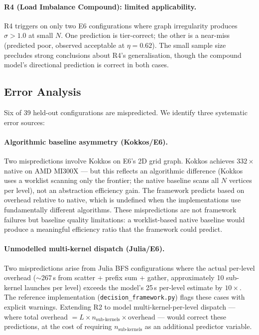 \paragraph{R4 (Load Imbalance Compound): limited applicability.}
R4 triggers on only two E6 configurations where graph irregularity
produces $\sigma > 1.0$ at small $N$. One prediction is tier-correct;
the other is a near-miss (predicted poor, observed acceptable at
$\eta = 0.62$). The small sample size precludes strong conclusions about
R4's generalisation, though the compound model's directional prediction
is correct in both cases.

\subsection{Error Analysis}
\label{subsec:error_analysis}

Six of 39 held-out configurations are mispredicted. We identify three
systematic error sources:

\paragraph{Algorithmic baseline asymmetry (Kokkos/E6).}
Two mispredictions involve Kokkos on E6's 2D grid graph. Kokkos achieves
$332\times$ native on AMD MI300X --- but this reflects an algorithmic
difference (Kokkos uses a worklist scanning only the frontier; the native
baseline scans all $N$ vertices per level), not an abstraction efficiency
gain. The framework predicts based on overhead relative to native, which
is undefined when the implementations use fundamentally different
algorithms. These mispredictions are not framework failures but baseline
quality limitations: a worklist-based native baseline would produce a
meaningful efficiency ratio that the framework could predict.

\paragraph{Unmodelled multi-kernel dispatch (Julia/E6).}
Two mispredictions arise from Julia BFS configurations where the actual
per-level overhead ($\sim$267\,\textmu{}s from scatter + prefix sum +
gather, approximately 10 sub-kernel launches per level) exceeds the
model's 25\,\textmu{}s per-level estimate by $10\times$. The
reference implementation (\texttt{decision\_framework.py}) flags these
cases with explicit warnings. Extending R2 to model multi-kernel-per-level
dispatch --- where total overhead $= L \times n_{\text{sub-kernels}}
\times \text{overhead}$ --- would correct these predictions, at the cost
of requiring $n_{\text{sub-kernels}}$ as an additional predictor variable.

